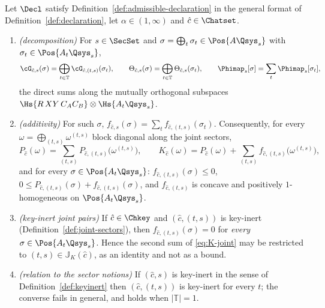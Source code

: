 \begin{lemma}\label{lem:joint-sectors}
Let $\Decl$ satisfy Definition~\ref{def:admissible-declaration} in the general format of
Definition~\ref{def:declaration}, let $\alpha\in(1,\infty)$ and
$\hat c\in\Chatset$.
\begin{enumerate}[label=(\roman*),leftmargin=2.2em]
\item \emph{(decomposition)} For $s\in\SecSet$ and
$\sigma=\bigoplus_{t}\sigma_t\in\Pos{A\Qsys_s}$ with
$\sigma_t\in\Pos{A_t\Qsys_s}$,
\begin{equation}\label{eq:G-joint}
  \cG_{\hat c,s}(\sigma)=\bigoplus_{t\in\mathbb{T}}
  \cG_{\hat c,(t,s)}(\sigma_t),\qquad
  \Theta_{\hat c,s}(\sigma)=\bigoplus_{t\in\mathbb{T}}
  \Theta_{\hat c,s}(\sigma_t),\qquad
  \Phimap_s[\sigma]=\sum_{t}\Phimap_s[\sigma_t],
\end{equation}
the direct sums along the mutually orthogonal subspaces
$\Hs{R\,XY\,C_AC_B}\otimes\Hs{A_t\Qsys_s}$.
\item \emph{(additivity)} For such $\sigma$,
$f_{\hat c,s}(\sigma)=\sum_tf_{\hat c,(t,s)}(\sigma_t)$. Consequently, for
every $\omega=\bigoplus_{(t,s)}\omega^{(t,s)}$ block diagonal along the joint
sectors,
\begin{equation}\label{eq:K-joint}
  P_{\hat c}(\omega)=\sum_{(t,s)}P_{\hat c,(t,s)}\big(\omega^{(t,s)}\big),
  \qquad
  K_{\hat c}(\omega)=P_{\hat c}(\omega)
  +\sum_{(t,s)}f_{\hat c,(t,s)}\big(\omega^{(t,s)}\big),
\end{equation}
and for every $\sigma\in\Pos{A_t\Qsys_s}$: $f_{\hat c,(t,s)}(\sigma)\le0$,
$0\le P_{\hat c,(t,s)}(\sigma)+f_{\hat c,(t,s)}(\sigma)$, and
$f_{\hat c,(t,s)}$ is concave and positively $1$-homogeneous on
$\Pos{A_t\Qsys_s}$.
\item \emph{(key-inert joint pairs)} If $\hat c\in\Chkey$ and
$(\hat c,(t,s))$ is key-inert (Definition~\ref{def:joint-sectors}), then
$f_{\hat c,(t,s)}(\sigma)=0$ for \emph{every} $\sigma\in\Pos{A_t\Qsys_s}$.
Hence the second sum of \eqref{eq:K-joint} may be restricted to
$(t,s)\in\mathbb{J}_K(\hat c)$, as an identity and not as a bound.
\item \emph{(relation to the sector notions)} If $(\hat c,s)$ is key-inert in
the sense of Definition~\ref{def:keyinert} then $(\hat c,(t,s))$ is key-inert
for every $t$; the converse fails in general, and holds when
$|\mathbb{T}|=1$.
\end{enumerate}
\end{lemma}

